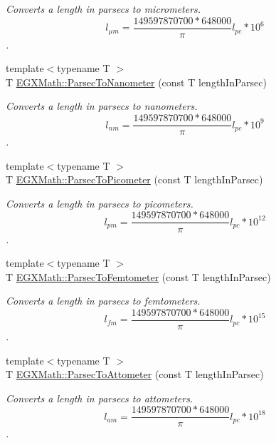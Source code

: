 \begin{DoxyCompactItemize}
\begin{DoxyCompactList}\small\item\em Converts a length in parsecs to micrometers. \[ l_{\mu m}=\frac{149597870700 * 648000}{\pi}l_{pc} * 10^{6} \]. \end{DoxyCompactList}\item 
{\footnotesize template$<$typename T $>$ }\\T \mbox{\hyperlink{group___e_g_x_math-_conversions-_length_conversions-_astronomical-_parsec-_s_i_gab2226196e39edbba8fe0862d0fd75870}{E\+G\+X\+Math\+::\+Parsec\+To\+Nanometer}} (const T length\+In\+Parsec)
\begin{DoxyCompactList}\small\item\em Converts a length in parsecs to nanometers. \[ l_{nm}=\frac{149597870700 * 648000}{\pi}l_{pc} * 10^{9} \]. \end{DoxyCompactList}\item 
{\footnotesize template$<$typename T $>$ }\\T \mbox{\hyperlink{group___e_g_x_math-_conversions-_length_conversions-_astronomical-_parsec-_s_i_ga2d56b414320940d42a8956239e54c8b0}{E\+G\+X\+Math\+::\+Parsec\+To\+Picometer}} (const T length\+In\+Parsec)
\begin{DoxyCompactList}\small\item\em Converts a length in parsecs to picometers. \[ l_{pm}=\frac{149597870700 * 648000}{\pi}l_{pc} * 10^{12} \]. \end{DoxyCompactList}\item 
{\footnotesize template$<$typename T $>$ }\\T \mbox{\hyperlink{group___e_g_x_math-_conversions-_length_conversions-_astronomical-_parsec-_s_i_ga6b6fd844f1af67b873c629f579a8b9ec}{E\+G\+X\+Math\+::\+Parsec\+To\+Femtometer}} (const T length\+In\+Parsec)
\begin{DoxyCompactList}\small\item\em Converts a length in parsecs to femtometers. \[ l_{fm}=\frac{149597870700 * 648000}{\pi}l_{pc} * 10^{15} \]. \end{DoxyCompactList}\item 
{\footnotesize template$<$typename T $>$ }\\T \mbox{\hyperlink{group___e_g_x_math-_conversions-_length_conversions-_astronomical-_parsec-_s_i_ga235c67c3c7b55d4ec553df3e1f435fbd}{E\+G\+X\+Math\+::\+Parsec\+To\+Attometer}} (const T length\+In\+Parsec)
\begin{DoxyCompactList}\small\item\em Converts a length in parsecs to attometers. \[ l_{am}=\frac{149597870700 * 648000}{\pi}l_{pc} * 10^{18} \]. \end{DoxyCompactList}\item 

\end{DoxyCompactItemize}
